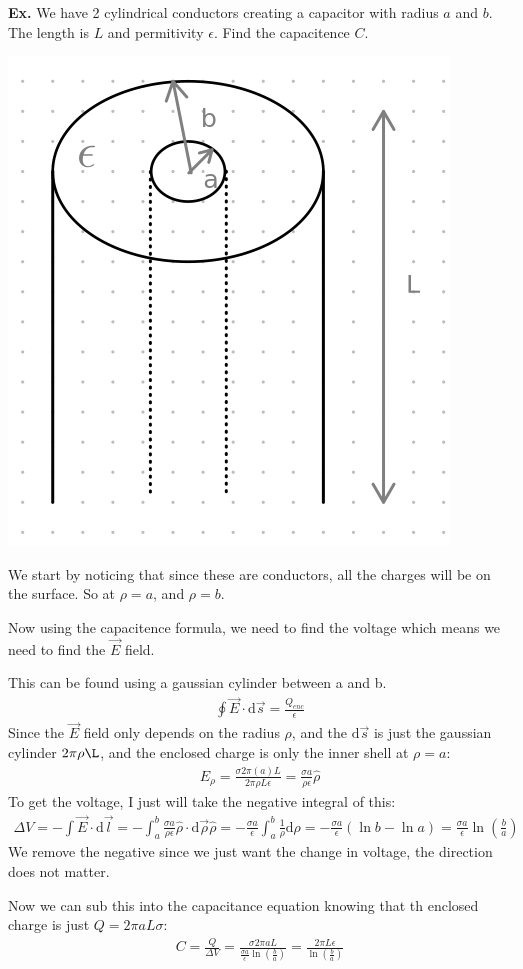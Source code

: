 \documentclass[12pt,letterpaper]{article} \usepackage{amsmath} \usepackage{graphicx} \usepackage[margin=1in]{geometry} \usepackage{longtable}  \usepackage{amssymb}
\begin{document}
	\begin{mdframed}
		\textbf{Ex. } We have 2 cylindrical conductors creating a capacitor with radius $a$ and $b$. The length is $L$ and permitivity $\epsilon$. Find the capacitence $C$. 
		\begin{center}
			\includegraphics[width=0.4\linewidth]{ex-cap}
		\end{center}
	
		We start by noticing that since these are conductors, all the charges will be on the surface. So at $\rho = a$, and $\rho = b$. 
		
		Now using the capacitence formula, we need to find the voltage which means we need to find the $\vec E$ field. 
		
		This can be found using a gaussian cylinder between a and b. 
		\begin{align*}
			\oint \vec E \cdot \mathrm d \vec s = \frac{Q_{enc}}{\epsilon}
		\end{align*}
		Since the $\vec E$ field only depends on the radius $\rho$, and the $\mathrm d \vec s$ is just the gaussian cylinder $2\pi \rho \L$, and the enclosed charge is only the inner shell at $\rho = a$:
		\begin{align*}
			E_\rho = \frac{\sigma 2\pi (a)L}{2\pi \rho L \epsilon} = \frac{\sigma a}{\rho \epsilon} \hat \rho
		\end{align*}
		To get the voltage, I just will take the negative integral of this:
		\begin{align*}
			\Delta V = -\int \vec E \cdot \mathrm d \vec l = -\int_a^b \frac{\sigma a}{\rho \epsilon}\hat\rho \cdot \mathrm d \vec \rho\hat\rho = -\frac{\sigma a}{\epsilon}\int^b_a \frac{1}{\rho} \mathrm d \rho = -\frac{\sigma a}{\epsilon} (\ln b - \ln a) = \frac{\sigma a}{\epsilon} \ln\left(\frac{b}{a}\right)
		\end{align*}
		We remove the negative since we just want the change in voltage, the direction does not matter. 
		
		Now we can sub this into the capacitance equation knowing that th enclosed charge is just $Q=2\pi a L\sigma$:
		\begin{align*}
			C = \frac{Q}{\Delta V} = \frac{\sigma2\pi a L}{\frac{\sigma a}{\epsilon} \ln\left(\frac{b}{a}\right)} = \frac{2\pi L\epsilon}{ \ln\left(\frac{b}{a}\right)}
		\end{align*}
		
	\end{mdframed}
	
\end{document}
